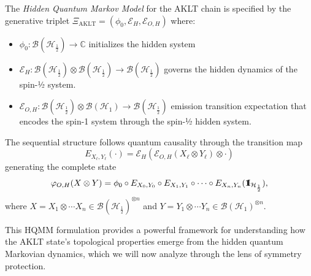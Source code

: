 \documentclass[12pt,a4paper]{article}
\def\id{{\bf 1}\!\!{\rm I}}
\begin{document}
The \emph{Hidden Quantum Markov Model} for the AKLT chain is specified by the generative triplet $\Xi_{\mathrm{AKLT}} = (\phi_0, \mathcal{E}_H, \mathcal{E}_{O,H})$ where:
\begin{itemize}
    \item $\phi_0: \mathcal{B}(\mathcal{H}_{\frac{1}{2}}) \to \mathbb{C}$ initializes the hidden system
    \item $\mathcal{E}_H: \mathcal{B}(\mathcal{H}_{\frac{1}{2}}) \otimes \mathcal{B}(\mathcal{H}_{\frac{1}{2}}) \to \mathcal{B}(\mathcal{H}_{\frac{1}{2}})$ governs the hidden dynamics  of the spin-½ system.
    \item $\mathcal{E}_{O,H}: \mathcal{B}(\mathcal{H}_{\frac{1}{2}}) \otimes \mathcal{B}(\mathcal{H}_{1}) \to \mathcal{B}(\mathcal{H}_{\frac{1}{2}})$ emission transition expectation that encodes the spin-1 system through the spin-½ hidden system.
\end{itemize}
The sequential structure follows quantum causality through the transition map
\begin{equation}\label{eq:TXY}
  E_{X_\ell,Y_\ell}(\cdot) = \mathcal{E}_H(\mathcal{E}_{O,H}(X_\ell \otimes Y_\ell) \otimes \cdot)
\end{equation}
generating the complete state
\begin{equation}\label{eq_TXY}
 \varphi_{O,H}(X \otimes Y) = \phi_0 \circ E_{X_0,Y_0} \circ E_{X_1,Y_1} \circ \cdots \circ E_{X_n,Y_n}(\id_{\mathcal{H}_{\frac{1}{2}}}),
\end{equation}
where $X = X_1\otimes\cdots X_n\in \mathcal{B}(\mathcal{H}_{\frac{1}{2}})^{\otimes n}$ and $Y = Y_1\otimes\cdots Y_n\in \mathcal{B}(\mathcal{H}_{1})^{\otimes n}$.


This HQMM formulation provides a powerful framework for understanding how the AKLT state's topological properties emerge from the hidden quantum Markovian dynamics, which we will now analyze through the lens of symmetry protection.
\end{document}
